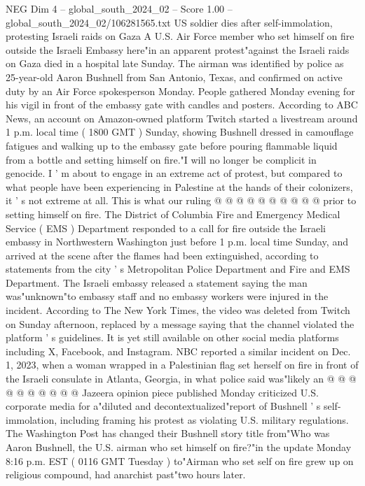 \begin{textsample}{NEG Dim 4 – global\_south\_2024\_02 – Score 1.00 – global\_south\_2024\_02/106281565.txt}  \label{ex:f4_neg_382}
US soldier dies after self-immolation, protesting Israeli raids on Gaza A U.S.
Air Force member who set himself on fire outside the Israeli Embassy here"in an apparent protest"against the Israeli raids on Gaza died in a hospital late Sunday.
The airman was identified by police as 25-year-old Aaron Bushnell from San Antonio, Texas, and confirmed on active duty by an Air Force spokesperson Monday.
People gathered Monday evening for his vigil in front of the embassy gate with candles and posters.
According to ABC News, an account on Amazon-owned platform Twitch started a livestream around 1 p.m. local time ( 1800 GMT ) Sunday, showing Bushnell dressed in camouflage fatigues and walking up to the embassy gate before pouring flammable liquid from a bottle and setting himself on fire."I will no longer be complicit in genocide.
I ' m about to engage in an extreme act of protest, but compared to what people have been experiencing in Palestine at the hands of their colonizers, it ' s not extreme at all.
This is what our ruling @ @ @ @ @ @ @ @ @ @ prior to setting himself on fire.
The District of Columbia Fire and Emergency Medical Service ( EMS ) Department responded to a call for fire outside the Israeli embassy in Northwestern Washington just before 1 p.m. local time Sunday, and arrived at the scene after the flames had been extinguished, according to statements from the city ' s Metropolitan Police Department and Fire and EMS Department.
The Israeli embassy released a statement saying the man was"unknown"to embassy staff and no embassy workers were injured in the incident.
According to The New York Times, the video was deleted from Twitch on Sunday afternoon, replaced by a message saying that the channel violated the platform ' s guidelines.
It is yet still available on other social media platforms including X, Facebook, and Instagram.
NBC reported a similar incident on Dec. 1, 2023, when a woman wrapped in a Palestinian flag set herself on fire in front of the Israeli consulate in Atlanta, Georgia, in what police said was"likely an @ @ @ @ @ @ @ @ @ @ Jazeera opinion piece published Monday criticized U.S. corporate media for a"diluted and decontextualized"report of Bushnell ' s self-immolation, including framing his protest as violating U.S. military regulations.
The Washington Post has changed their Bushnell story title from"Who was Aaron Bushnell, the U.S. airman who set himself on fire?"in the update Monday 8:16 p.m.
EST ( 0116 GMT Tuesday ) to"Airman who set self on fire grew up on religious compound, had anarchist past"two hours later.

\end{textsample}
